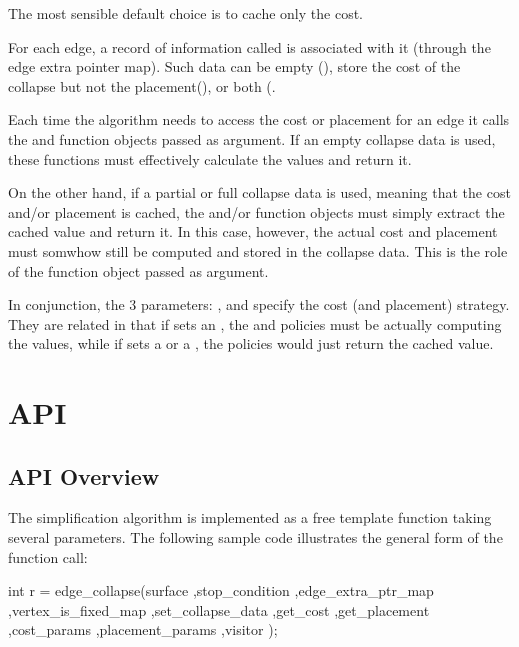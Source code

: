 The most sensible default choice is to cache only the cost.

For each edge, a record of information called  is associated with it (through the edge extra pointer map). Such data can be empty (), store the cost of the collapse but not the placement(), or both (.

Each time the algorithm needs to access the cost or placement for an edge it calls the  and  function objects passed as argument. If an empty collapse data is used, these functions must effectively calculate the values and return it.

On the other hand, if a partial or full collapse data is used, meaning that the cost and/or placement is cached, the  and/or  function objects must simply extract the cached value and return it. In this case, however, the actual cost and placement must somwhow still be computed and stored in the collapse data. This is the role of the  function object passed as argument.

In conjunction, the 3 parameters: ,  and  specify the cost (and placement) strategy. They are related in that if  sets an , the  and  policies must be actually computing the values, while if  sets a  or a , the policies would just return the cached value.

\section{API}

\subsection{API Overview}

The simplification algorithm is implemented as a free template function taking several parameters. The following sample code illustrates the general form of the function call:

\begin{cprog}
int r = edge_collapse(surface
                     ,stop_condition
                     ,edge_extra_ptr_map
                     ,vertex_is_fixed_map
                     ,set_collapse_data
                     ,get_cost
                     ,get_placement
                     ,cost_params
                     ,placement_params
                     ,visitor 
                     );
\end{cprog}

